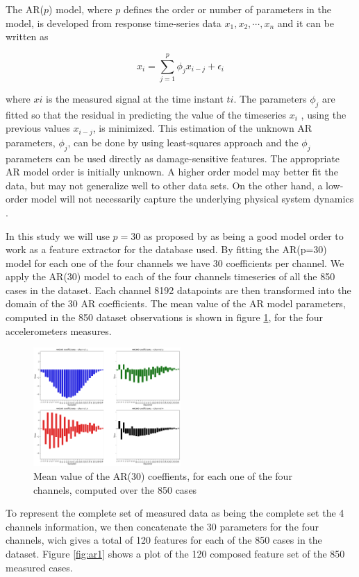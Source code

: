 \documentclass[twocolumn]{article}
\begin{document}
The AR($p$) model, where $p$ defines the order or number of parameters in the model, is developed from
response time-series data $x_1, x_2, \cdots, x_n$ and it can be written as

\[x_i = \sum_{j=1}^{p} \phi_j x_{i-j} + \epsilon_i\]

where $xi$ is the measured signal at the time instant $ti$. The parameters $\phi_j$ are fitted so that the residual in predicting the value of the timeseries $x_i$ , using the previous values $x_{i-j}$, is minimized. This estimation of the unknown AR parameters, $\phi_j$, can be done by using least-squares approach and the $\phi_j$ parameters can be used directly as damage-sensitive features. The appropriate AR model order is initially unknown. A higher order model may better fit the data, but may not generalize well to other data sets. On the other hand, a low-order model will not necessarily capture the underlying physical system dynamics \cite{autoreg}.

In this study we will use $p = 30$ as proposed by \cite{autoreg} as being a good model order to work as a feature extractor for the database used. By fitting the AR(p=30) model for each one of the four channels we have 30 coefficients per channel. We apply the AR(30) model to each of the four channels timeseries of all the 850 cases in the dataset. Each channel 8192 datapoints are then transformed into the domain of the 30 AR coefficients. The mean value of the AR model parameters, computed in the 850 dataset observations is shown in figure \ref{fig:ar0}, for the four accelerometers measures.

\begin{figure}[H]
      \centering
      \includegraphics[width=0.5\textwidth]{ar_0.png}
      \caption{Mean value of the AR(30) coeffients, for each one of the four channels, computed over the 850 cases}
      \label{fig:ar0}
\end{figure}

To represent the complete set of measured data as being the complete set the 4 channels information, we then concatenate the 30 parameters for the four channels, wich gives a total of 120 features for each of the 850 cases in the dataset. Figure \ref{fig:ar1} shows a plot of the 120 composed feature set of the 850 measured cases.
\end{document}
